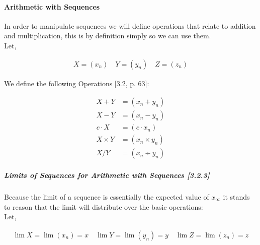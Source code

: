 \documentclass[class=article, crop=false]{standalone}
\begin{document}
\paragraph{Arithmetic with Sequences}
In order to manipulate sequences we will define operations that relate to addition and multiplication, this is by definition simply so we can use them. \\

Let,

\begin{align}
  X = (x_n) \quad Y = (y_n) \quad Z = (z_n)
  \label{seqdefgen}
\end{align}

We define the following Operations [3.2, p. 63]:

\begin{align}
  X+Y &= \left( x_{n} + y_{n} \right) \label{addseqdef} \\
  X-Y &= \left( x_{n} - y_{n} \right) \label{minseqdef} \\ 
  c \cdot X &= \left( c\cdot x_{n}\right) \label{conmultseqdef}\\
  X\times Y &= \left( x_{n} \times y_{n} \right) \label{multseqdef} \\
  X/Y &= \left( x_{n} \div y_{n} \right) 
  \label{divseqdef}
\end{align}





\subparagraph{Limits of Sequences for Arithmetic with Sequences [3.2.3]}
Because the limit of a sequence is essentially the expected value of $x_{\infty}$ it stands to reason that the limit will distribute over the basic operations: \\

Let,

\begin{align}
  \lim X = \lim(x_n) =  x \quad \lim Y = \lim(y_n) = y \quad \lim Z = \lim(z_n) = z
  \label{seqdeflim}
\end{align}
\end{document}
